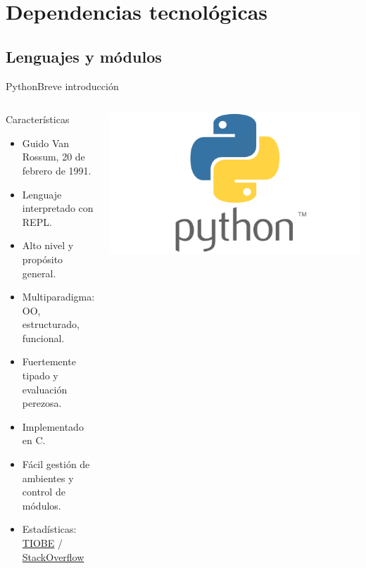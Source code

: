 \documentclass[aspectratio=169,10pt]{beamer}
\begin{document}
\section{Dependencias tecnológicas}
\subsection{Lenguajes y módulos}

\begin{frame}{Python}{Breve introducción}
  \begin{columns}
    \begin{exampleblock}{Características}
      \begin{itemize}
        \item Guido Van Rossum, 20 de febrero de 1991.
        \item Lenguaje interpretado con REPL.
        \item Alto nivel y propósito general.
        \item Multiparadigma: OO, estructurado, funcional.
        \item Fuertemente tipado y evaluación perezosa.
        \item Implementado en C.
        \item Fácil gestión de ambientes y control de módulos.
        \item Estadísticas: \href{https://www.tiobe.com/tiobe-index/}{TIOBE} / \href{https://insights.stackoverflow.com/survey/2021}{StackOverflow}
      \end{itemize}
    \end{exampleblock}
    \includegraphics[width=\columnwidth]{python.png}
  \end{columns}
\end{frame}
\end{document}
